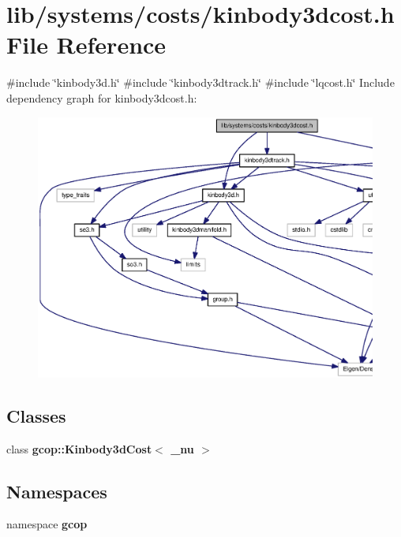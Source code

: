 \section{lib/systems/costs/kinbody3dcost.h \-File \-Reference}
\label{kinbody3dcost_8h}
{\ttfamily \#include \char`\"{}kinbody3d.\-h\char`\"{}}\*
{\ttfamily \#include \char`\"{}kinbody3dtrack.\-h\char`\"{}}\*
{\ttfamily \#include \char`\"{}lqcost.\-h\char`\"{}}\*
\-Include dependency graph for kinbody3dcost.\-h\-:
\nopagebreak
\begin{figure}[H]
\begin{center}
\leavevmode
\includegraphics[width=350pt]{kinbody3dcost_8h__incl}
\end{center}
\end{figure}
\subsection*{\-Classes}
\begin{DoxyCompactItemize}
\item 
class {\bf gcop\-::\-Kinbody3d\-Cost$<$ \-\_\-nu $>$}
\end{DoxyCompactItemize}
\subsection*{\-Namespaces}
\begin{DoxyCompactItemize}
\item 
namespace {\bf gcop}
\end{DoxyCompactItemize}

